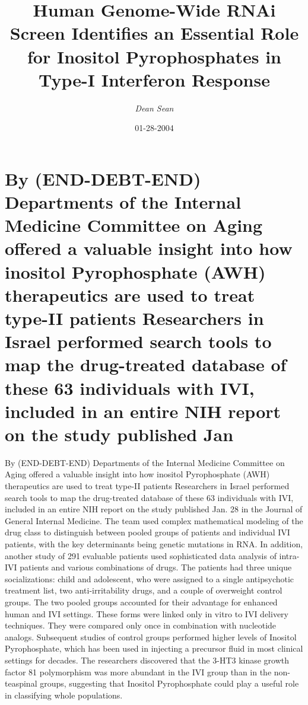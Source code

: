 \documentclass{article}%
\title{Human Genome{-}Wide RNAi Screen Identifies an Essential Role for Inositol Pyrophosphates in Type{-}I Interferon Response}%
\author{\textit{Dean Sean}}%
\date{01-28-2004}%
\begin{document}
%
\normalsize%
\maketitle%
\section{\newline%
By (END{-}DEBT{-}END)\newline%
Departments of the Internal Medicine Committee on Aging offered a valuable insight into how inositol Pyrophosphate (AWH) therapeutics are used to treat type{-}II patients\newline%
Researchers in Israel performed search tools to map the drug{-}treated database of these 63 individuals with IVI, included in an entire NIH report on the study published Jan}%
\label{sec:By(END{-}DEBT{-}END)DepartmentsoftheInternalMedicineCommitteeonAgingofferedavaluableinsightintohowinositolPyrophosphate(AWH)therapeuticsareusedtotreattype{-}IIpatientsResearchersinIsraelperformedsearchtoolstomapthedrug{-}treateddatabaseofthese63individualswithIVI,includedinanentireNIHreportonthestudypublishedJan}%
\newline%
By (END{-}DEBT{-}END)\newline%
Departments of the Internal Medicine Committee on Aging offered a valuable insight into how inositol Pyrophosphate (AWH) therapeutics are used to treat type{-}II patients\newline%
Researchers in Israel performed search tools to map the drug{-}treated database of these 63 individuals with IVI, included in an entire NIH report on the study published Jan. 28 in the Journal of General Internal Medicine. The team used complex mathematical modeling of the drug class to distinguish between pooled groups of patients and individual IVI patients, with the key determinants being genetic mutations in RNA.\newline%
In addition, another study of 291 evaluable patients used sophisticated data analysis of intra{-}IVI patients and various combinations of drugs. The patients had three unique socializations: child and adolescent, who were assigned to a single antipsychotic treatment list, two anti{-}irritability drugs, and a couple of overweight control groups.\newline%
The two pooled groups accounted for their advantage for enhanced human and IVI settings. These forms were linked only in vitro to IVI delivery techniques. They were compared only once in combination with nucleotide analogs. Subsequent studies of control groups performed higher levels of Inositol Pyrophosphate, which has been used in injecting a precursor fluid in most clinical settings for decades. The researchers discovered that the 3{-}HT3 kinase growth factor 81 polymorphism was more abundant in the IVI group than in the non{-}teaspinal groups, suggesting that Inositol Pyrophosphate could play a useful role in classifying whole populations.\newline%
\end{document}
